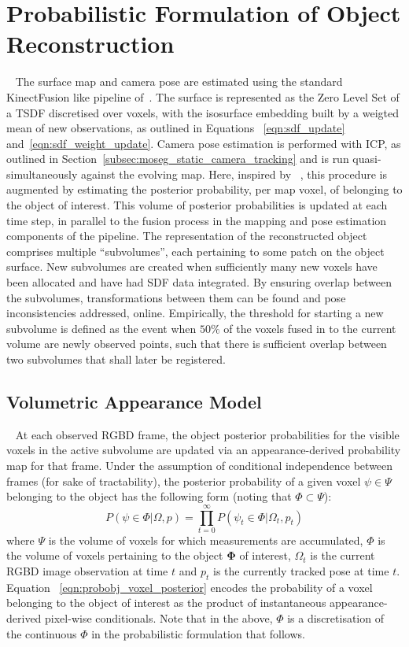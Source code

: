 \section{Probabilistic Formulation of Object Reconstruction}
~\label{sec:probobj_prob_formulation}
The surface map and camera pose are estimated using the standard KinectFusion
like pipeline of~\cite{Newcombe2011,Prisacariu2014}. The surface is represented
as the Zero Level Set of a TSDF discretised over voxels, with the isosurface 
embedding built by a weigted mean of new observations, as outlined in Equations
~\ref{eqn:sdf_update} and~\ref{eqn:sdf_weight_update}. Camera pose estimation is
performed with ICP, as outlined in Section~\ref{subsec:moseg_static_camera_tracking} 
and is run quasi-simultaneously against the evolving map. Here, inspired by 
~\cite{Kolev2006}, this procedure is augmented by estimating the posterior probability, 
per map voxel, of belonging to the object of interest. This volume of posterior 
probabilities is updated at each time step, in parallel to the fusion process in the 
mapping and pose estimation components of the pipeline. The representation of the 
reconstructed object comprises multiple ``subvolumes'', each pertaining to some 
patch on the object surface. New subvolumes are created when sufficiently many new 
voxels have been allocated and have had SDF data integrated. By ensuring overlap
between the subvolumes, transformations between them can be found and pose
inconsistencies addressed, online. Empirically, the threshold for starting a new
subvolume is defined as the event when \( 50\% \) of the voxels fused in to the
current volume are newly observed points, such that there is sufficient overlap 
between two subvolumes that shall later be registered.

\subsection{Volumetric Appearance Model}
~\label{subsec:probobj_vol_appearance_model}
At each observed RGBD frame, the object posterior probabilities for the visible
voxels in the active subvolume are updated via an appearance-derived probability
map for that frame. Under the assumption of conditional independence between
frames (for sake of tractability), the posterior probability of a given voxel
\( \psi \in \Psi \) belonging to the object has the following form (noting that
\( \Phi \subset \Psi \)):
\begin{equation}
\label{eqn:probobj_voxel_posterior}
P(\psi \in \Phi | \Omega, p) = \prod_{t=0}^{\infty}
P(\psi_{t} \in \Phi | \Omega_{t}, p_{t})
\end{equation}
where \( \Psi \) is the volume of voxels for which measurements are accumulated,
\( \Phi \)  is the volume of voxels pertaining to the object \(\bm{\Phi}\) of 
interest, \(\Omega_{t}\) is the current RGBD image observation at time \(t\) and 
\(p_{t}\) is the currently tracked pose at time \(t\). Equation 
~\ref{eqn:probobj_voxel_posterior} encodes the probability of a voxel belonging 
to the object of interest as the product of instantaneous appearance-derived 
pixel-wise conditionals. Note that in the above, \( \Phi \) is a discretisation of 
the continuous \( \Phi \) in the probabilistic formulation that follows.

